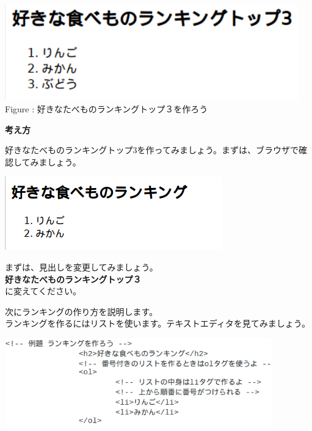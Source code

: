 \documentclass[a4paper,12pt]{jarticle}
\begin{document}
\bigskip


\begin{minipage}{12.716cm}
  {\upshape
    \includegraphics[width=12.716cm,height=4.14cm]{textbook-img178.png}
    \newline
    Figure :
    好きなたべものランキングトップ３を作ろう}
\end{minipage}


\bigskip


\bigskip

\textbf{考え方}



\bigskip



好きなたべものランキングトップ3を作ってみましょう。まずは、ブラウザで確認してみましょう。


\bigskip

\includegraphics[width=9.417cm,height=3.173cm]{textbook-img179.png}

\bigskip

まずは、見出しを変更してみましょう。\\
\textbf{好きなたべものランキングトップ３}\\
に変えてください。


\bigskip

次にランキングの作り方を説明します。\\
ランキングを作るにはリストを使います。テキストエディタを見てみましょう。

\centering
\includegraphics[width=11.553cm,height=3.812cm]{textbook-img180.png}
\end{document}
